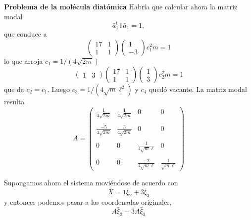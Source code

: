 \documentclass[10pt,oneside]{CBFT_book}
\begin{document}
\begin{ejemplo}{\bf Problema de la molécula diatómica}
Habría que calcular ahora la matriz modal
\[
	\bar{a}_1^t \mathbb{T} \bar{a}_1 = 1,
\]
que conduce a 
\[
	\begin{pmatrix}
	17 & 1 \\
	1  & 1
	\end{pmatrix}
	\begin{pmatrix}
	1 \\
	-3
	\end{pmatrix}
	c_1^2 m = 1
\]
lo que arroja $c_1 = 1 /(4\sqrt{2m})$
\[
	\begin{pmatrix}
	1 & 3 
	\end{pmatrix}
	\begin{pmatrix}
	17 & 1 \\
	1  & 1
	\end{pmatrix}
	\begin{pmatrix}
	1 \\
	3
	\end{pmatrix}
	c_2^2 m = 1
\]
que da $ c_2 = c_1 $. Luego $c_3 = 1 / (4 \sqrt{m} \ell^2 )$ y $c_4$ quedó vacante.
La matriz modal resulta
\[
	A = \begin{pmatrix}
		\frac{1}{4\sqrt{2m}}	&	\frac{1}{4\sqrt{2m}}	&	0	&	0	\\
		\\
		\frac{-5}{4\sqrt{2m}}	&	\frac{3}{4\sqrt{2m}}	&	0	&	0	\\
		\\
		0	&	0	&	\frac{1}{4\sqrt{m}\ell}	&	0	\\
		\\
		0	&	0	&	\frac{-2}{4\sqrt{m}\ell}	&	\frac{1}{\sqrt{m}\ell}
	    \end{pmatrix}
\]

Supongamos ahora el sistema moviéndose de acuerdo con
\[
	\bar{X} = 1 \bar{\xi}_2 + 3 \bar{\xi}_3
\]
y entonces podemos pasar a las coordenadas originales,
\[
	A \bar{\xi}_2 + 3 A \bar{\xi}_3
\]


\end{ejemplo}
\end{document}
